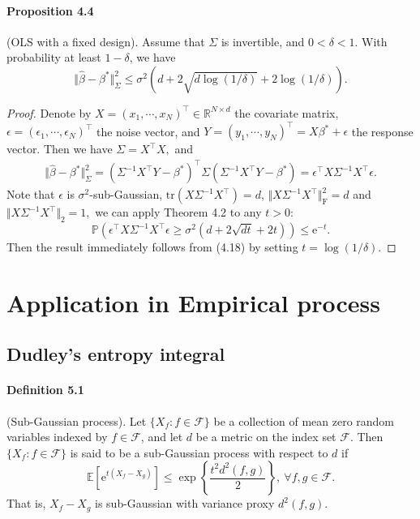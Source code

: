 \documentclass{article}
\newcommand{\E}{\mathbb{E}}
\begin{document}
\paragraph{Proposition 4.4} (OLS with a fixed design). Assume that $\Sigma$ is invertible, and $0<\delta < 1.$ With probability at least $1 - \delta$, we have
\begin{equation*}
	\Vert\widehat{\beta} - \beta^*\Vert_\Sigma^2 \leq \sigma^2\left(d + 2\sqrt{d\log(1/\delta)} + 2\log(1/\delta)\right).\tag{4.16}
\end{equation*}
\begin{proof}
Denote by $X=(x_1,\cdots,x_N)^\top\in\mathbb{R}^{N\times d}$ the covariate matrix, $\epsilon=(\epsilon_1,\cdots,\epsilon_N)^\top$ the noise vector, and $Y=(y_1,\cdots,y_N)^\top=X\beta^*+\epsilon$ the response vector. Then we have $\Sigma=X^\top X,$ and
\begin{align*}
	\Vert\widehat{\beta}-\beta^*\Vert_\Sigma^2 = (\Sigma^{-1}X^\top Y-\beta^*)^\top\Sigma(\Sigma^{-1}X^\top Y-\beta^*)= \epsilon^\top X\Sigma^{-1} X^\top\epsilon.\tag{4.17}
\end{align*}
Note that $\epsilon$ is $\sigma^2$-sub-Gaussian, $\mathrm{tr}(X\Sigma^{-1}X^\top) = d$, $\Vert X\Sigma^{-1}X^\top\Vert_\mathrm{F}^2 = d$ and $\Vert X\Sigma^{-1}X^\top\Vert_2=1,$ we can apply Theorem 4.2 to any $t>0$:
\begin{equation*}
	\mathbb{P}\left(\epsilon^\top X\Sigma^{-1} X^\top\epsilon \geq \sigma^2\left(d + 2\sqrt{dt} + 2t\right)\right)\leq\mathrm{e}^{-t}.\tag{4.18}
\end{equation*}
Then the result immediately follows from (4.18) by setting $t=\log(1/\delta)$.
\end{proof}

\section{Application in Empirical process}
\subsection{Dudley's entropy integral}
\paragraph{Definition 5.1} (Sub-Gaussian process). Let $\{X_f:f\in\mathcal{F}\}$ be a collection of mean zero random variables indexed by $f\in\mathcal{F}$, and let $d$ be a metric on the index set $\mathcal{F}.$ Then $\{X_f:f\in\mathcal{F}\}$ is said to be a sub-Gaussian process with respect to $d$ if
\begin{equation*}
	\E\left[\mathrm{e}^{t(X_f - X_g)}\right] \leq \exp\left\{\frac{t^2d^2(f,g)}{2}\right\},\ \forall f,g\in\mathcal{F}.\tag{5.1}
\end{equation*}
That is, $X_f - X_g$ is sub-Gaussian with variance proxy $d^2(f,g).$
\end{document}
